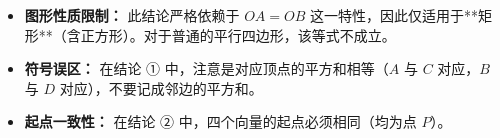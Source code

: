 \begin{trapbox}
\begin{itemize}
    \item \textbf{图形性质限制：} 此结论严格依赖于 $OA=OB$ 这一特性，因此仅适用于**矩形**（含正方形）。对于普通的平行四边形，该等式不成立。
    \item \textbf{符号误区：} 在结论 ① 中，注意是对应顶点的平方和相等（$A$ 与 $C$ 对应，$B$ 与 $D$ 对应），不要记成邻边的平方和。
    \item \textbf{起点一致性：} 在结论 ② 中，四个向量的起点必须相同（均为点 $P$）。
\end{itemize}
\end{trapbox}